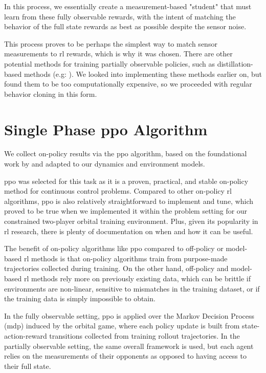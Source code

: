 In this process, we essentially create a measurement-based "student" that must learn from these fully observable rewards, with the intent of matching the behavior of the full state rewards as best as possible despite the sensor noise.

This process proves to be perhaps the simplest way to match sensor measurements to \acs{rl} rewards, which is why it was chosen. There are other potential methods for training partially observable policies, such as distillation-based methods (e.g: \cite{bajcsy2024learning}). We looked into implementing these methods earlier on, but found them to be too computationally expensive, so we proceeded with regular behavior cloning in this form.



\section{Single Phase \acs{ppo} Algorithm}
\label{sec:single-phase-ppo}

We collect on-policy results via the \acs{ppo} algorithm, based on the foundational work by \cite{schulman2017ppo} and adapted to our dynamics and environment models.

\acs{ppo} was selected for this task as it is a proven, practical, and stable on-policy method for continuous control problems. Compared to other on-policy \acs{rl} algorithms, \acs{ppo} is also relatively straightforward to implement and tune, which proved to be true when we implemented it within the problem setting for our constrained two-player orbital training environment. Plus, given its popularity in \acs{rl} research, there is plenty of documentation on when and how it can be useful.

The benefit of on-policy algorithms like \acs{ppo} compared to off-policy or model-based \acs{rl} methods is that on-policy algorithms train from purpose-made trajectories collected during training. On the other hand, off-policy and model-based \acs{rl} methods rely more on previously existing data, which can be brittle if environments are non-linear, sensitive to mismatches in the training dataset, or if the training data is simply impossible to obtain.

In the fully observable setting, \acs{ppo} is applied over the Markov Decision Process (\acs{mdp}) induced by the orbital game, where each policy update is built from state-action-reward transitions collected from training rollout trajectories. In the partially observable setting, the same overall framework is used, but each agent relies on the measurements of their opponents as opposed to having access to their full state.


